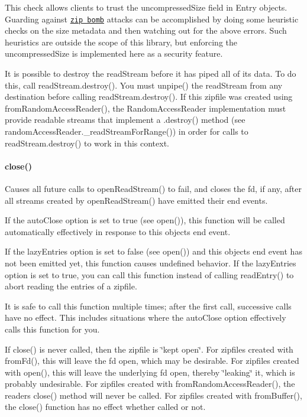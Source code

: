 This check allows clients to trust the {\ttfamily uncompressed\+Size} field in {\ttfamily Entry} objects. Guarding against \href{http://en.wikipedia.org/wiki/Zip_bomb}{\tt zip bomb} attacks can be accomplished by doing some heuristic checks on the size metadata and then watching out for the above errors. Such heuristics are outside the scope of this library, but enforcing the {\ttfamily uncompressed\+Size} is implemented here as a security feature.

It is possible to destroy the {\ttfamily read\+Stream} before it has piped all of its data. To do this, call {\ttfamily read\+Stream.\+destroy()}. You must {\ttfamily unpipe()} the {\ttfamily read\+Stream} from any destination before calling {\ttfamily read\+Stream.\+destroy()}. If this zipfile was created using {\ttfamily from\+Random\+Access\+Reader()}, the {\ttfamily Random\+Access\+Reader} implementation must provide readable streams that implement a {\ttfamily .destroy()} method (see {\ttfamily random\+Access\+Reader.\+\_\+read\+Stream\+For\+Range()}) in order for calls to {\ttfamily read\+Stream.\+destroy()} to work in this context.

\paragraph*{close()}

Causes all future calls to {\ttfamily open\+Read\+Stream()} to fail, and closes the fd, if any, after all streams created by {\ttfamily open\+Read\+Stream()} have emitted their {\ttfamily end} events.

If the {\ttfamily auto\+Close} option is set to {\ttfamily true} (see {\ttfamily open()}), this function will be called automatically effectively in response to this object\textquotesingle{}s {\ttfamily end} event.

If the {\ttfamily lazy\+Entries} option is set to {\ttfamily false} (see {\ttfamily open()}) and this object\textquotesingle{}s {\ttfamily end} event has not been emitted yet, this function causes undefined behavior. If the {\ttfamily lazy\+Entries} option is set to {\ttfamily true}, you can call this function instead of calling {\ttfamily read\+Entry()} to abort reading the entries of a zipfile.

It is safe to call this function multiple times; after the first call, successive calls have no effect. This includes situations where the {\ttfamily auto\+Close} option effectively calls this function for you.

If {\ttfamily close()} is never called, then the zipfile is \char`\"{}kept open\char`\"{}. For zipfiles created with {\ttfamily from\+Fd()}, this will leave the {\ttfamily fd} open, which may be desirable. For zipfiles created with {\ttfamily open()}, this will leave the underlying {\ttfamily fd} open, thereby \char`\"{}leaking\char`\"{} it, which is probably undesirable. For zipfiles created with {\ttfamily from\+Random\+Access\+Reader()}, the reader\textquotesingle{}s {\ttfamily close()} method will never be called. For zipfiles created with {\ttfamily from\+Buffer()}, the {\ttfamily close()} function has no effect whether called or not.

